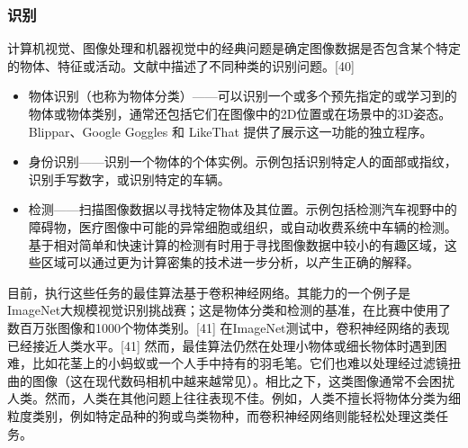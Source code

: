 \subsubsection{识别}  
计算机视觉、图像处理和机器视觉中的经典问题是确定图像数据是否包含某个特定的物体、特征或活动。文献中描述了不同种类的识别问题。[40]
\begin{itemize}
\item 物体识别（也称为物体分类）——可以识别一个或多个预先指定的或学习到的物体或物体类别，通常还包括它们在图像中的2D位置或在场景中的3D姿态。Blippar、Google Goggles 和 LikeThat 提供了展示这一功能的独立程序。
\item 身份识别——识别一个物体的个体实例。示例包括识别特定人的面部或指纹，识别手写数字，或识别特定的车辆。
\item 检测——扫描图像数据以寻找特定物体及其位置。示例包括检测汽车视野中的障碍物，医疗图像中可能的异常细胞或组织，或自动收费系统中车辆的检测。基于相对简单和快速计算的检测有时用于寻找图像数据中较小的有趣区域，这些区域可以通过更为计算密集的技术进一步分析，以产生正确的解释。
\end{itemize}
目前，执行这些任务的最佳算法基于卷积神经网络。其能力的一个例子是ImageNet大规模视觉识别挑战赛；这是物体分类和检测的基准，在比赛中使用了数百万张图像和1000个物体类别。[41] 在ImageNet测试中，卷积神经网络的表现已经接近人类水平。[41] 然而，最佳算法仍然在处理小物体或细长物体时遇到困难，比如花茎上的小蚂蚁或一个人手中持有的羽毛笔。它们也难以处理经过滤镜扭曲的图像（这在现代数码相机中越来越常见）。相比之下，这类图像通常不会困扰人类。然而，人类在其他问题上往往表现不佳。例如，人类不擅长将物体分类为细粒度类别，例如特定品种的狗或鸟类物种，而卷积神经网络则能轻松处理这类任务。
